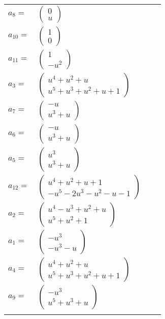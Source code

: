 \documentclass[1p]{elsarticle_modified}
\theoremstyle{definition}
\begin{document}
\begin{tabular}{m{7pt} m{180pt} m{7pt} m{180pt} }
\flushright $a_{8}=$&$\begin{pmatrix}0\\u\end{pmatrix}$ \\
\flushright $a_{10}=$&$\begin{pmatrix}1\\0\end{pmatrix}$ \\
\flushright $a_{11}=$&$\begin{pmatrix}1\\- u^2\end{pmatrix}$ \\
\flushright $a_{3}=$&$\begin{pmatrix}u^4+u^2+u\\u^5+u^3+u^2+u+1\end{pmatrix}$ \\
\flushright $a_{7}=$&$\begin{pmatrix}- u\\u^3+u\end{pmatrix}$ \\
\flushright $a_{6}=$&$\begin{pmatrix}- u\\u^3+u\end{pmatrix}$ \\
\flushright $a_{5}=$&$\begin{pmatrix}u^3\\u^3+u\end{pmatrix}$ \\
\flushright $a_{12}=$&$\begin{pmatrix}u^4+u^2+u+1\\- u^5-2 u^3- u^2- u-1\end{pmatrix}$ \\
\flushright $a_{2}=$&$\begin{pmatrix}u^4- u^3+u^2+u\\u^5+u^2+1\end{pmatrix}$ \\
\flushright $a_{1}=$&$\begin{pmatrix}- u^3\\- u^3- u\end{pmatrix}$ \\
\flushright $a_{4}=$&$\begin{pmatrix}u^4+u^2+u\\u^5+u^3+u^2+u+1\end{pmatrix}$ \\
\flushright $a_{9}=$&$\begin{pmatrix}- u^3\\u^5+u^3+u\end{pmatrix}$\\&\end{tabular}
\end{document}
